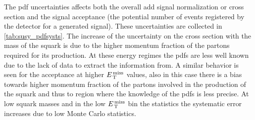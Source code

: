 The \gls{pdf} uncertainties affects both the overall \gls{add} signal
normalization or cross section and the signal acceptance (the potential number
of events registered by the detector for a generated signal). These
uncertainties are collected in \cref{tab:susy_pdfsysts}. The increase of the
uncertainty on the cross section with the mass of the squark is due to the
higher momentum fraction of the partons required for its production. At these
energy regimes the \glspl{pdf} are less well known due to the lack of data to
extract the information from. A similar behavior is seen for the acceptance at
higher $\met$ values, also in this case there is a bias towards higher momentum
fraction of the partons involved in the production of the squark and thus to
region where the knowledge of the \glspl{pdf} is less precise. At low squark
masses and in the low $\met$ bin the statistics the systematic error increases
due to low Monte Carlo statistics.
\begin{table}
\centering
\small
{}
\caption{\gls{pdf} systematic uncertainties in \% on the SUSY compressed
  models. The uncertainty is the envelop that contains the signal yields from
  the three \gls{pdf} families, and their error bands. The first row indicates
  the systematic uncertainty on the overall normalisation. The following rows
  show uncertainty on the acceptance in the signal region $\met$ bins.}
\label{tab:susy_pdfsysts}
\end{table}
